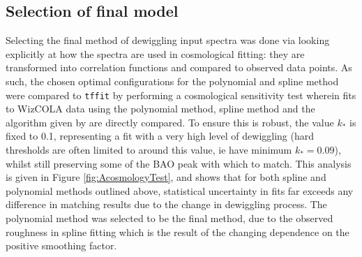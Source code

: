 \documentclass[iop,twocolappendix]{emulateapj}
\begin{document}
	
	
	\subsection{Selection of final model}
	
	Selecting the final method of dewiggling input spectra was done via looking explicitly at how the spectra are used in cosmological fitting: they are transformed into correlation functions and compared to observed data points. As such, the chosen optimal configurations for the polynomial and spline method were compared to \verb;tffit; by performing a cosmological sensitivity test wherein fits to WizCOLA data using the polynomial method, spline method and the algorithm given by \citet{EisensteinHu1998} are directly compared. To ensure this is robust, the value $k_*$ is fixed to 0.1, representing a fit with a very high level of dewiggling (hard thresholds are often limited to around this value, ie \citet{ChuangWang2012} have minimum $k_* = 0.09$), whilst still preserving some of the BAO peak with which to match. This analysis is given in Figure \ref{fig:AcosmologyTest}, and shows that for both spline and polynomial methods outlined above, statistical uncertainty in fits far exceeds any difference in matching results due to the change in dewiggling process. The polynomial method was selected to be the final method, due to the observed roughness in spline fitting which is the result of the changing dependence on the positive smoothing factor.
	
\end{document}
